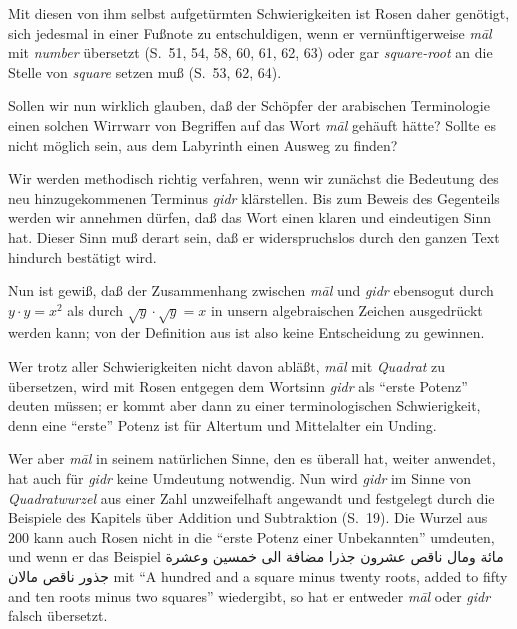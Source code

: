 \documentclass[11pt,a4paper]{article}
\newcommand{\RL}[1]{\beginR#1\endR}
\newcommand{\ar}[1]{{\arabicfont\RL{#1}}}
\newcommand{\enquote}[1]{``#1''}
\begin{document}
Mit diesen von ihm selbst aufget\"urmten Schwierigkeiten ist Rosen daher gen\"otigt, sich jedesmal in einer Fu\ss{}note zu entschuldigen, wenn er vern\"unftigerweise \textit{m\=al} mit \textit{number} \"ubersetzt (S.\ 51, 54, 58, 60, 61, 62, 63) oder gar \textit{square-root} an die Stelle von \textit{square} setzen mu\ss{} (S.\ 53, 62, 64).

Sollen wir nun wirklich glauben, da\ss{} der Sch\"opfer der arabischen Terminologie einen solchen Wirrwarr von Begriffen auf das Wort \textit{m\=al} geh\"auft h\"atte? Sollte es nicht m\"oglich sein, aus dem Labyrinth einen Ausweg zu finden?

Wir werden methodisch richtig verfahren, wenn wir zun\"achst die Bedeutung des neu hinzugekommenen Terminus \textit{gidr} kl\"arstellen. Bis zum Beweis des Gegenteils werden wir annehmen d\"urfen, da\ss{} das Wort einen klaren und eindeutigen Sinn hat. Dieser Sinn mu\ss{} derart sein, da\ss{} er widerspruchslos durch den ganzen Text hindurch best\"atigt wird.

Nun ist gewi\ss{}, da\ss{} der Zusammenhang zwischen \textit{m\=al} und \textit{gidr} ebensogut durch $y \cdot y = x^{2}$ als durch $\sqrt{y} \cdot \sqrt{y} = x$ in unsern algebraischen Zeichen ausgedr\"uckt werden kann; von der Definition aus ist also keine Entscheidung zu gewinnen.

Wer trotz aller Schwierigkeiten nicht davon abl\"a\ss{}t, \textit{m\=al} mit \textit{Quadrat} zu \"ubersetzen, wird mit Rosen entgegen dem Wortsinn \textit{gidr} als \enquote{erste Potenz} deuten m\"ussen; er kommt aber dann zu einer terminologischen Schwierigkeit, denn eine \enquote{erste} Potenz ist f\"ur Altertum und Mittelalter ein Unding.

Wer aber \textit{m\=al} in seinem nat\"urlichen Sinne, den es \"uberall hat, weiter anwendet, hat auch f\"ur \textit{gidr} keine Umdeutung notwendig. Nun wird \textit{gidr} im Sinne von \textit{Quadratwurzel} aus einer Zahl unzweifelhaft angewandt und festgelegt durch die Beispiele des Kapitels \"uber Addition und Subtraktion (S.\ 19). Die Wurzel aus 200 kann auch Rosen nicht in die \enquote{erste Potenz einer Unbekannten} umdeuten, und wenn er das Beispiel \ar{مائة ومال ناقص عشرون جذرا مضافة الى خمسين وعشرة جذور ناقص مالان} mit \enquote{A hundred and a square minus twenty roots, added to fifty and ten roots minus two squares} wiedergibt, so hat er entweder \textit{m\=al} oder \textit{gidr} falsch \"ubersetzt.
\end{document}
